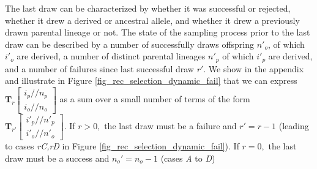 \documentclass[review,nonatbib]{elsarticle}
\newcommand{\dslash}{/\!\!/}
\newcommand{\Coalc}[4]{\begin{bmatrix}#1\dslash #2 \\ #3\dslash #4 \end{bmatrix}}
\begin{document}
The last draw can be characterized by whether it was successful or rejected, whether it drew a 
derived or ancestral allele, and whether it drew a previously drawn parental lineage or not. 
The state of the sampling process prior to the last draw can be described by a number of successfully draws 
offspring $n'_o$, of which $i'_o$ are derived, a number of distinct parental lineages 
$n'_p$ of which $i'_p$ are derived, and a number of failures since last successful draw $r'$.
We show in the appendix and illustrate in Figure \ref{fig_rec_selection_dynamic_fail}  that we 
can express $\mathbf{T}_{r}\Coalc{i_p}{n_p}{i_o}{n_o}$ as a sum over a small number of terms 
of the form $\mathbf{T}_{r'}\Coalc{i'_p}{n'_p}{i'_o}{n'_o}.$ If $r>0,$ the last draw must be a failure 
and $r' = r - 1$ (leading to cases \textit{rC,rD} in Figure \ref{fig_rec_selection_dynamic_fail}).
If $r=0,$ the last draw must be a success and $n_o' = n_o-1$ (cases \textit{A} to \textit{D})

 
  
  
\end{document}
